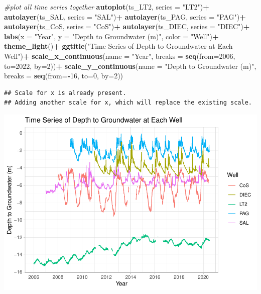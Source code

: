\documentclass[
]{article}
\newenvironment{Shaded}{\begin{snugshade}}{\end{snugshade}}
\newcommand{\AttributeTok}[1]{\textcolor[rgb]{0.13,0.29,0.53}{#1}}
\newcommand{\CommentTok}[1]{\textcolor[rgb]{0.56,0.35,0.01}{\textit{#1}}}
\newcommand{\DecValTok}[1]{\textcolor[rgb]{0.00,0.00,0.81}{#1}}
\newcommand{\FunctionTok}[1]{\textcolor[rgb]{0.13,0.29,0.53}{\textbf{#1}}}
\newcommand{\NormalTok}[1]{#1}
\newcommand{\SpecialCharTok}[1]{\textcolor[rgb]{0.81,0.36,0.00}{\textbf{#1}}}
\newcommand{\StringTok}[1]{\textcolor[rgb]{0.31,0.60,0.02}{#1}}
\begin{document}
\begin{Shaded}
\begin{Highlighting}[]
\CommentTok{\#plot all time series together}
\FunctionTok{autoplot}\NormalTok{(ts\_LT2, }\AttributeTok{series =} \StringTok{"LT2"}\NormalTok{)}\SpecialCharTok{+}
  \FunctionTok{autolayer}\NormalTok{(ts\_SAL, }\AttributeTok{series =} \StringTok{"SAL"}\NormalTok{)}\SpecialCharTok{+}
  \FunctionTok{autolayer}\NormalTok{(ts\_PAG, }\AttributeTok{series =} \StringTok{"PAG"}\NormalTok{)}\SpecialCharTok{+}
  \FunctionTok{autolayer}\NormalTok{(ts\_CoS, }\AttributeTok{series =} \StringTok{"CoS"}\NormalTok{)}\SpecialCharTok{+}
  \FunctionTok{autolayer}\NormalTok{(ts\_DIEC, }\AttributeTok{series =} \StringTok{"DIEC"}\NormalTok{)}\SpecialCharTok{+}
  \FunctionTok{labs}\NormalTok{(}\AttributeTok{x =} \StringTok{"Year"}\NormalTok{, }\AttributeTok{y =} \StringTok{"Depth to Groundwater (m)"}\NormalTok{, }\AttributeTok{color =} \StringTok{"Well"}\NormalTok{)}\SpecialCharTok{+}
  \FunctionTok{theme\_light}\NormalTok{()}\SpecialCharTok{+}
  \FunctionTok{ggtitle}\NormalTok{(}\StringTok{"Time Series of Depth to Groundwater at Each Well"}\NormalTok{)}\SpecialCharTok{+}
  \FunctionTok{scale\_x\_continuous}\NormalTok{(}\AttributeTok{name =} \StringTok{"Year"}\NormalTok{, }\AttributeTok{breaks =} \FunctionTok{seq}\NormalTok{(}\AttributeTok{from=}\DecValTok{2006}\NormalTok{, }\AttributeTok{to=}\DecValTok{2022}\NormalTok{, }\AttributeTok{by=}\DecValTok{2}\NormalTok{))}\SpecialCharTok{+}
  \FunctionTok{scale\_y\_continuous}\NormalTok{(}\AttributeTok{name =} \StringTok{"Depth to Groundwater (m)"}\NormalTok{, }
                     \AttributeTok{breaks =} \FunctionTok{seq}\NormalTok{(}\AttributeTok{from=}\SpecialCharTok{{-}}\DecValTok{16}\NormalTok{, }\AttributeTok{to=}\DecValTok{0}\NormalTok{, }\AttributeTok{by=}\DecValTok{2}\NormalTok{))}
\end{Highlighting}
\end{Shaded}

\begin{verbatim}
## Scale for x is already present.
## Adding another scale for x, which will replace the existing scale.
\end{verbatim}

\includegraphics{Kaufman_McNeill_ENV797_Project_files/figure-latex/unnamed-chunk-3-1.pdf}
\end{document}
